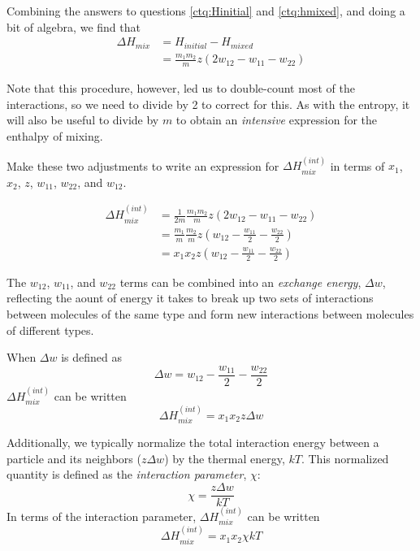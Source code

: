 \begin{activity}
\begin{ctqs}
		\question Combining the answers to questions \ref{ctq:Hinitial} and \ref{ctq:hmixed}, and doing a bit of algebra, we find that 
						\begin{align*}
							\Delta H_{mix} &= H_{initial} - H_{mixed} \\
								&= \frac{m_1 m_2}{m} z (2 w_{12} - w_{11} - w_{22})
						\end{align*}
		
				Note that this procedure, however, led us to double-count most of the interactions, so we need to divide by 2 to correct for this.  As with the entropy, it will also be useful to divide by $m$ to obtain an \emph{intensive} expression for the enthalpy of mixing.
		
			Make these two adjustments to write an expression for $\Delta H_{mix}^{(int)}$ in terms of $x_1$, $x_2$, $z$, $w_{11}$, $w_{22}$, and $w_{12}$.
			
			\begin{solution}[1.75in]
				\begin{align*}
					\Delta H_{mix}^{(int)} &= \frac{1}{2m}\frac{m_1 m_2}{m} z (2 w_{12} - w_{11} - w_{22})\\
						&= \frac{m_1}{m}\frac{m_2}{m} z \left( w_{12} - \frac{w_{11}}{2} - \frac{w_{22}}{2}\right)\\
						&= x_1 x_2 z \left( w_{12} - \frac{w_{11}}{2} - \frac{w_{22}}{2}\right)
				\end{align*}
			\end{solution}
			
\end{ctqs}
	
\begin{infobox}

The $w_{12}$, $w_{11}$, and $w_{22}$ terms can be combined into an \emph{exchange energy}, $\Delta w$, reflecting the aount of energy it takes to break up two sets of interactions between molecules of the same type and form new interactions between molecules of different types.

When $\Delta w$ is defined as
\begin{equation*}
	\Delta w = w_{12} - \frac{w_{11}}{2} - \frac{w_{22}}{2}
\end{equation*}
$\Delta H_{mix}^{(int)}$ can be written
\begin{equation*}
	\Delta H_{mix}^{(int)} = x_1 x_2 z \Delta w
\end{equation*}

Additionally, we typically normalize the total interaction energy between a particle and its neighbors ($z\Delta w$) by the thermal energy, $kT$.  This normalized quantity is defined as the \emph{interaction parameter}, $\chi$:
\begin{equation*}
	\chi = \frac{z\Delta w}{kT}
\end{equation*}
In terms of the interaction parameter, $\Delta H_{mix}^{(int)}$ can be written
\begin{equation*}
	\Delta H_{mix}^{(int)} = x_1 x_2 \chi kT
\end{equation*}


\end{infobox}
\end{activity}
